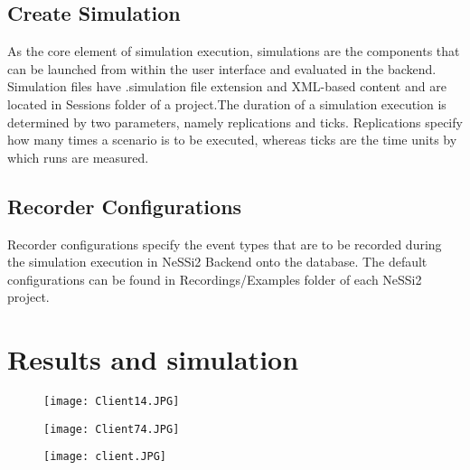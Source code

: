 \subsection{Create Simulation}
As the core element of simulation execution, simulations are the components that can be
launched from within the user interface and evaluated in the backend. Simulation files
have .simulation file extension and XML-based content and are located in Sessions
folder of a project.The duration of a simulation execution is determined by two parameters, namely replications and ticks. Replications specify how many times a scenario is to be executed, whereas ticks are the time units by which runs are measured.
\subsection{Recorder Configurations}
Recorder configurations specify the event types that are to be recorded during the simulation execution in NeSSi2 Backend onto the database. The default configurations can
be found in Recordings/Examples folder of each NeSSi2 project.
\newpage
\section{Results and simulation}
\begin{figure}[h]
	\centering
		\texttt{[image: Client14.JPG]}
	\caption{}
	\label{fig:client10}
\end{figure}
\begin{figure}[h]
	\centering
		\texttt{[image: Client74.JPG]}
	\caption{}
	\label{fig:client13}
\end{figure}
\begin{figure}[h]
	\centering
		\texttt{[image: client.JPG]}
	\caption{}
	\label{fig:client54}
\end{figure}










